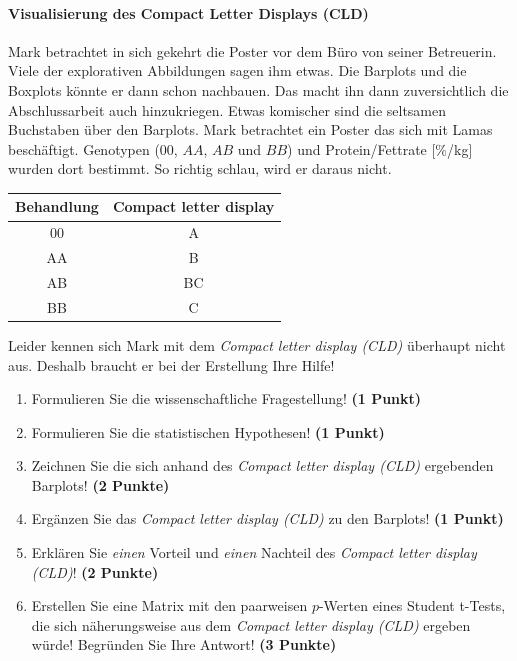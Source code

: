 \documentclass[a4paper, 9pt]{scrartcl}\usepackage[]{graphicx}\usepackage[]{xcolor}
\newenvironment{knitrout}{}{} %
\begin{document}
\ifcollection
\paragraph{Visualisierung des Compact Letter Displays (CLD)}
\fi

Mark betrachtet in sich gekehrt die Poster vor dem Büro von seiner Betreuerin. Viele der explorativen Abbildungen sagen ihm etwas. Die Barplots und die Boxplots könnte er dann schon nachbauen. Das macht ihn dann zuversichtlich die Abschlussarbeit auch hinzukriegen. Etwas komischer sind die seltsamen Buchstaben über den Barplots. Mark betrachtet ein Poster das sich mit Lamas beschäftigt. Genotypen ($00$, $AA$, $AB$ und $BB$) und Protein/Fettrate [\%/kg] wurden dort bestimmt. So richtig schlau, wird er daraus nicht.

\begin{knitrout}
\color{fgcolor}\begin{table}[!h]
\centering\begingroup\fontsize{10}{12}\selectfont

\begin{tabular}{cc}
\toprule
\textbf{Behandlung} & \textbf{Compact letter display}\\
\midrule
00 & A\\
AA & B\\
AB & BC\\
BB & C\\
\bottomrule
\end{tabular}
\endgroup{}
\end{table}

\end{knitrout}

Leider kennen sich Mark mit dem \textit{Compact letter display (CLD)} überhaupt nicht aus. Deshalb braucht er bei der Erstellung Ihre Hilfe!

\begin{enumerate}
  \item Formulieren Sie die wissenschaftliche Fragestellung! \textbf{(1 Punkt)}
  \item Formulieren Sie die statistischen Hypothesen! \textbf{(1 Punkt)}
\item Zeichnen Sie die sich anhand des \textit{Compact letter display (CLD)} ergebenden Barplots! \textbf{(2 Punkte)}
\item Ergänzen Sie das \textit{Compact letter display (CLD)} zu den Barplots! \textbf{(1 Punkt)}
\item Erklären Sie \textit{einen} Vorteil und \textit{einen} Nachteil des \textit{Compact letter display (CLD)}! \textbf{(2 Punkte)}
\item Erstellen Sie eine Matrix mit den paarweisen $p$-Werten eines Student t-Tests, die sich näherungsweise aus dem \textit{Compact letter display (CLD)} ergeben würde! Begründen Sie Ihre Antwort! \textbf{(3 Punkte)}
\end{enumerate}
\end{document}
